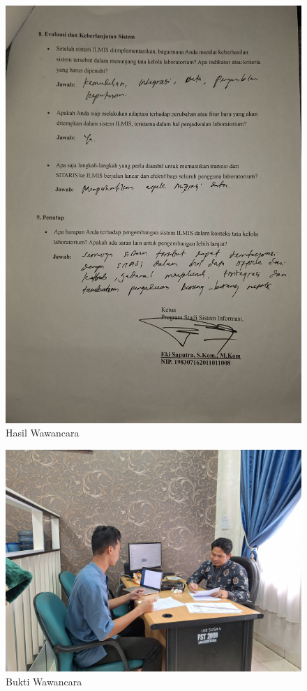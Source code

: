 \begin{figure}[h]
	\centering
	\includegraphics[width=0.82\linewidth]{konten/gambar/wawancara/5.jpg}
	\caption{Hasil Wawancara}
	\label{fig:hasil-wawancara}
\end{figure}
\begin{figure}[h]
	\centering
	\includegraphics[width=0.82\linewidth]{konten/gambar/wawancara.jpg}
	\caption{Bukti Wawancara}
	\label{fig:hasil-wawancara}
\end{figure}

